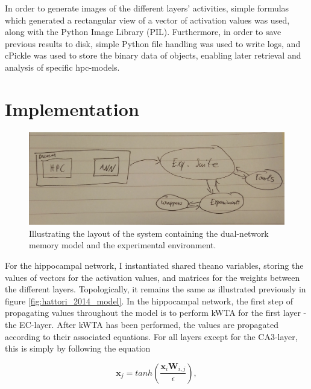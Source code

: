 In order to generate images of the different layers' activities, simple formulas which generated a rectangular view of a vector of activation values was used, along with the Python Image Library (PIL). Furthermore, in order to save previous results to disk, simple Python file handling was used to write logs, and cPickle was used to store the binary data of objects, enabling later retrieval and analysis of specific hpc-models.

\section{Implementation}

\begin{figure}
    \centering
    \includegraphics[width=12cm]{fig/system_layout.png}
    \caption{Illustrating the layout of the system containing the dual-network memory model and the experimental environment.}
    \label{fig:system_layout}
\end{figure}



For the hippocampal network, I instantiated shared theano variables, storing the values of vectors for the activation values, and matrices for the weights between the different layers. Topologically, it remains the same as illustrated previously in figure \ref{fig:hattori_2014_model}. In the hippocampal network, the first step of propagating values throughout the model is to perform kWTA for the first layer - the EC-layer. After kWTA has been performed, the values are propagated according to their associated equations. For all layers except for the CA3-layer, this is simply by following the equation

\begin{equation}\label{eq:transfer_function_hpc}
    \textbf{x}_j = tanh (\frac{\textbf{x}_i \textbf{W}_{i,j}}{\epsilon}),
\end{equation}

